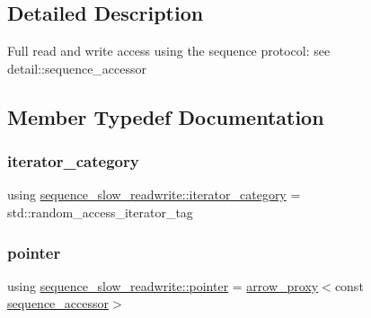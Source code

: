 \subsection{Detailed Description}
Full read and write access using the sequence protocol\+: see {\ttfamily detail\+::sequence\+\_\+accessor} 

\subsection{Member Typedef Documentation}
\mbox{\label{classsequence__slow__readwrite_a2697f5faf3ab47b580e49071a9993010}} 
\subsubsection{\texorpdfstring{iterator\_category}{iterator\_category}}
{\footnotesize\ttfamily using \mbox{\hyperlink{classsequence__slow__readwrite_a2697f5faf3ab47b580e49071a9993010}{sequence\+\_\+slow\+\_\+readwrite\+::iterator\+\_\+category}} =  std\+::random\+\_\+access\+\_\+iterator\+\_\+tag\hspace{0.3cm}{\ttfamily [protected]}}

\mbox{\label{classsequence__slow__readwrite_a5d342cf04b1e283c0dbb03e741cb3ae8}} 
\subsubsection{\texorpdfstring{pointer}{pointer}}
{\footnotesize\ttfamily using \mbox{\hyperlink{classsequence__slow__readwrite_a5d342cf04b1e283c0dbb03e741cb3ae8}{sequence\+\_\+slow\+\_\+readwrite\+::pointer}} =  \mbox{\hyperlink{structarrow__proxy}{arrow\+\_\+proxy}}$<$const \mbox{\hyperlink{pytypes_8h_afb835b9074801782e0f25a6d78d1d450}{sequence\+\_\+accessor}}$>$\hspace{0.3cm}{\ttfamily [protected]}}

\mbox{\label{classsequence__slow__readwrite_ad59d36dc33d3bcff00de01c2d21ffe42}} 
